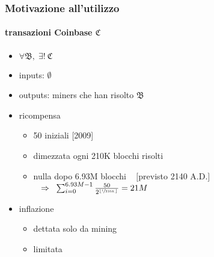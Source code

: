 \begin{frame}
	\frametitle{Motivazione all'utilizzo}
		\framesubtitle{transazioni Coinbase $\mathfrak{C}$}
		
		\begin{itemize}
			\item $\forall \mathfrak{B},\; \exists!\:\mathfrak{C}$
			\item inputs: $\emptyset$
			\item outputs: miners che han risolto $\mathfrak{B}$ 
			\item ricompensa 
			\begin{itemize}
			  	\item 50 \bitcoinA\; iniziali [2009]
				\item dimezzata ogni 210K blocchi risolti %
				\item nulla dopo 6.93M blocchi $\;\;\;[$previsto 2140 A.D.$]$
				\newline $\;\;\;\Rightarrow \;\; \sum_{i=0}^{6.93M-1}{\frac{50}{2^{\lfloor\sfrac{i}{210K}\rfloor}}}=21M$ \bitcoinA 	
			\end{itemize}
			\item inflazione 
			\begin{itemize}
				\item dettata solo da mining %
				\item limitata %
			\end{itemize}
		\end{itemize}
		
\end{frame}

% 
% 
% 
